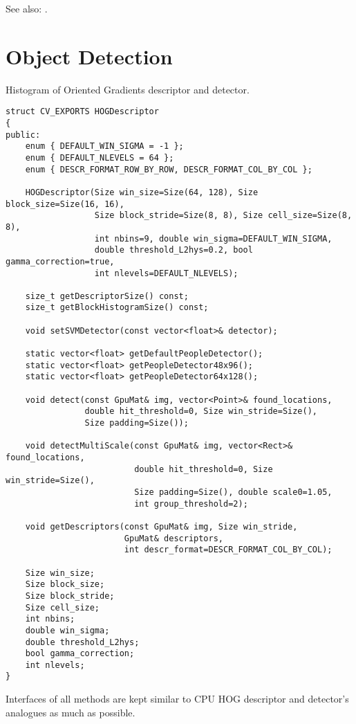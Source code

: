 See also: .

\section{Object Detection}

Histogram of Oriented Gradients descriptor and detector.

\begin{lstlisting}
struct CV_EXPORTS HOGDescriptor
{
public:
    enum { DEFAULT_WIN_SIGMA = -1 };
    enum { DEFAULT_NLEVELS = 64 };
    enum { DESCR_FORMAT_ROW_BY_ROW, DESCR_FORMAT_COL_BY_COL };

    HOGDescriptor(Size win_size=Size(64, 128), Size block_size=Size(16, 16),
                  Size block_stride=Size(8, 8), Size cell_size=Size(8, 8),
                  int nbins=9, double win_sigma=DEFAULT_WIN_SIGMA,
                  double threshold_L2hys=0.2, bool gamma_correction=true,
                  int nlevels=DEFAULT_NLEVELS);

    size_t getDescriptorSize() const;
    size_t getBlockHistogramSize() const;

    void setSVMDetector(const vector<float>& detector);

    static vector<float> getDefaultPeopleDetector();
    static vector<float> getPeopleDetector48x96();
    static vector<float> getPeopleDetector64x128();

    void detect(const GpuMat& img, vector<Point>& found_locations, 
                double hit_threshold=0, Size win_stride=Size(), 
                Size padding=Size());

    void detectMultiScale(const GpuMat& img, vector<Rect>& found_locations,
                          double hit_threshold=0, Size win_stride=Size(), 
                          Size padding=Size(), double scale0=1.05, 
                          int group_threshold=2);

    void getDescriptors(const GpuMat& img, Size win_stride, 
                        GpuMat& descriptors,
                        int descr_format=DESCR_FORMAT_COL_BY_COL);

    Size win_size;
    Size block_size;
    Size block_stride;
    Size cell_size;
    int nbins;
    double win_sigma;
    double threshold_L2hys;
    bool gamma_correction;
    int nlevels;
}
\end{lstlisting}

Interfaces of all methods are kept similar to CPU HOG descriptor and detector's analogues as much as possible.

